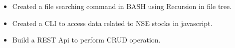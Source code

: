 
{\fontsize{9pt}{1em}\bodyfontlight\upshape\color{text}
  \begin{itemize}
    \item Created a file searching command in BASH using Recursion in file tree.
    \item Created a CLI to access data related to NSE stocks in javascript.
    \item Build a REST Api to perform CRUD operation.
  \end{itemize}
}
